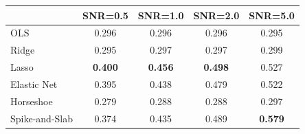 \begin{tabular}{lcccc}
\toprule
 & SNR=0.5 & SNR=1.0 & SNR=2.0 & SNR=5.0 \\
\midrule
OLS & 0.296 & 0.296 & 0.296 & 0.295 \\
Ridge & 0.295 & 0.297 & 0.297 & 0.299 \\
Lasso & \textbf{0.400} & \textbf{0.456} & \textbf{0.498} & 0.527 \\
Elastic Net & 0.395 & 0.438 & 0.479 & 0.522 \\
Horseshoe & 0.279 & 0.288 & 0.288 & 0.297 \\
Spike-and-Slab & 0.374 & 0.435 & 0.489 & \textbf{0.579} \\
\bottomrule
\end{tabular}
